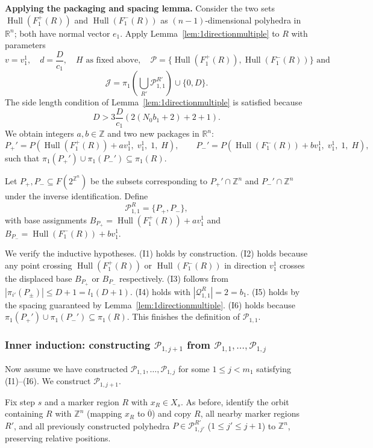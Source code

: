 \documentclass{amsart}
\theoremstyle{definition}
\DeclareMathOperator{\Hull}{Hull}
\begin{document}
\medskip
\noindent\textbf{Applying the packaging and spacing lemma.}
Consider the two sets $\Hull(F_1^+(R))$ and $\Hull(F_1^-(R))$ as
$(n-1)$-dimensional polyhedra in $\mathbb{R}^n$; both have normal vector
$e_1$. Apply Lemma~\ref{lem:1directionmultiple} to $R$ with parameters
\[
v=v_1^1,\quad d=\frac{D}{c_1},\quad H\text{ as fixed above},\quad
\mathcal{P}=\{\Hull(F_1^+(R)),\Hull(F_1^-(R))\} \text{ and}
\]
\[
\mathcal{J}=\pi_1\left (\bigcup_{R'}
\mathcal{P}_{1,1}^{R'}\right )\cup\{0, D\}.
\]
The side length condition of Lemma~\ref{lem:1directionmultiple} is
satisfied because
\[
D > 3\frac{D}{c_1}(2(N_0b_1+2)+2+1).
\]
 We obtain integers $a,b\in\mathbb{Z}$ and two
new packages in $\mathbb{R}^n$:
\[
P_+'=P(\Hull(F_1^+(R))+av_1^1,\; v_1^1,\; 1,\; H),\qquad
P_-'=P(\Hull(F_1^-(R))+bv_1^1,\; v_1^1,\; 1,\; H),
\]
such that $\pi_1(P_+')\cup\pi_1(P_-')\subseteq\pi_1(R)$.

Let $P_+, P_-\subseteq F(2^{\mathbb{Z}^n})$ be the subsets corresponding
to $P_+'\cap\mathbb{Z}^n$ and $P_-'\cap\mathbb{Z}^n$ under the inverse
identification. Define
\[
\mathcal{P}_{1,1}^R=\{P_+, P_-\},
\]
with base assignments
$B_{P_+}=\Hull(F_1^+(R))+av_1^1$ and
$B_{P_-}=\Hull(F_1^-(R))+bv_1^1$.

We verify the inductive hypotheses. (I1) holds by construction. (I2) holds
because any point crossing $\Hull(F_1^+(R))$ or $\Hull(F_1^-(R))$ in
direction $v_1^1$ crosses the displaced base $B_{P_+}$ or $B_{P_-}$
respectively. (I3) follows from
$|\pi_{i'}(P_\pm)|\leq D+1 = l_1(D+1)$. (I4) holds with
$|\mathcal{Q}_{1,1}^R|=2=b_1$. (I5) holds by the spacing guaranteed by
Lemma~\ref{lem:1directionmultiple}. (I6) holds because $\pi_1(P_+')\cup\pi_1(P_-')\subseteq\pi_1(R)$. This finishes the definition of $\mathcal{P}_{1,1}$.


\subsubsection{Inner induction: constructing $\mathcal{P}_{1,j+1}$ from
$\mathcal{P}_{1,1},\dots,\mathcal{P}_{1,j}$}

Now assume we have constructed
$\mathcal{P}_{1,1},\dots,\mathcal{P}_{1,j}$ for some $1\leq j<m_1$
satisfying (I1)--(I6). We construct $\mathcal{P}_{1,j+1}$.

Fix step $s$ and a marker region $R$ with $x_R\in X_s$. As before,
identify the orbit containing $R$ with $\mathbb{Z}^n$ (mapping $x_R$
to $\overline{0}$) and copy $R$, all nearby marker regions $R'$, and
all previously constructed polyhedra
$P\in\mathcal{P}_{1,j'}^{R'}$ ($1\leq j'\leq j+1$) to $\mathbb{Z}^n$,
preserving relative positions.
\end{document}
